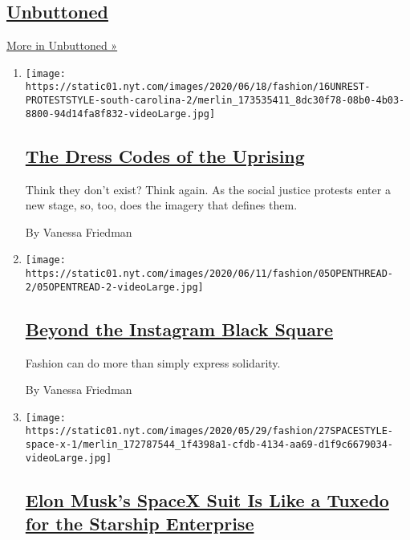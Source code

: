 \hypertarget{unbuttoned-1}{%
\subsection{\texorpdfstring{\href{/column/unbuttoned}{Unbuttoned}}{Unbuttoned}}\label{unbuttoned-1}}

\href{/column/unbuttoned}{More in Unbuttoned »}

\begin{enumerate}
\def\labelenumi{\arabic{enumi}.}
\item
  \texttt{[image: https://static01.nyt.com/images/2020/06/18/fashion/16UNREST-PROTESTSTYLE-south-carolina-2/merlin\_173535411\_8dc30f78-08b0-4b03-8800-94d14fa8f832-videoLarge.jpg]}

  \hypertarget{the-dress-codes-of-the-uprising}{%
  \subsection{\texorpdfstring{\href{/2020/06/16/fashion/the-dress-codes-of-the-uprising.html}{The
  Dress Codes of the
  Uprising}}{The Dress Codes of the Uprising}}\label{the-dress-codes-of-the-uprising}}

  Think they don't exist? Think again. As the social justice protests
  enter a new stage, so, too, does the imagery that defines them.

  By Vanessa Friedman
\item
  \texttt{[image: https://static01.nyt.com/images/2020/06/11/fashion/05OPENTHREAD-2/05OPENTREAD-2-videoLarge.jpg]}

  \hypertarget{beyond-the-instagram-black-square}{%
  \subsection{\texorpdfstring{\href{/2020/06/06/style/fashion-racism-actions.html}{Beyond
  the Instagram Black
  Square}}{Beyond the Instagram Black Square}}\label{beyond-the-instagram-black-square}}

  Fashion can do more than simply express solidarity.

  By Vanessa Friedman
\item
  \texttt{[image: https://static01.nyt.com/images/2020/05/29/fashion/27SPACESTYLE-space-x-1/merlin\_172787544\_1f4398a1-cfdb-4134-aa69-d1f9c6679034-videoLarge.jpg]}

  \hypertarget{elon-musks-spacex-suit-is-like-a-tuxedo-for-the-starship-enterprise}{%
  \subsection{\texorpdfstring{\href{/2020/05/27/fashion/SpaceX-Dragon-Suits.html}{Elon
  Musk's SpaceX Suit Is Like a Tuxedo for the Starship
  Enterprise}}{Elon Musk's SpaceX Suit Is Like a Tuxedo for the Starship Enterprise}}\label{elon-musks-spacex-suit-is-like-a-tuxedo-for-the-starship-enterprise}}


\end{enumerate}
